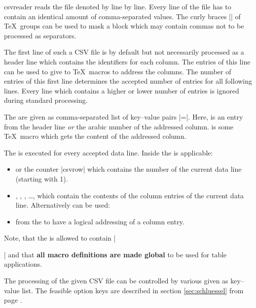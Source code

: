 \documentclass[a4paper,11pt]{ltxdoc}
\begin{document}
\begin{docCommand}{csvreader}{}
   reads the file denoted by  line by line.
  Every line of the file has to contain an identical amount of
  comma-separated values. The curly braces |{}| of \TeX\ groups can be used
  to mask a block which may contain commas not to be processed as separators.\smallskip

  The first line of such a CSV file is by default but not necessarily
  processed as a header line which contains the identifiers for each column.
  The entries of this line can be used to give  to \TeX\ macros
  to address the columns. The number of entries of this first line
  determines the accepted number of entries for all following lines.
  Every line which contains a higher or lower number of entries is ignored
  during standard processing.\smallskip

  The  are given as comma-separated list of key–value pairs
  \mbox{|=|}. Here,  is an entry from the
  header line \emph{or} the arabic number of the addressed column.
   is some \TeX\ macro which gets the content of the addressed column.\smallskip

  The  is executed for every accepted data line. Inside the
   is applicable:
  \begin{itemize}
  \item {} or the counter |csvrow| which contains the number of the
    current data line (starting with 1).
  \item {}, , , \ldots,
    which contain the contents of the column entries of the current data line.
    Alternatively can be used:
  \item {} from the  to have a logical
    addressing of a column entry.
  \end{itemize}
  Note, that the  is allowed to contain |\par| and
  that \textbf{all macro definitions are made global} to be used for table applications.\smallskip

  The processing of the given CSV file can be controlled by various
   given as key–value list. The feasible option keys
  are described in section \ref{sec:schluessel} from page \pageref{sec:schluessel}.


\end{docCommand}
\end{document}
